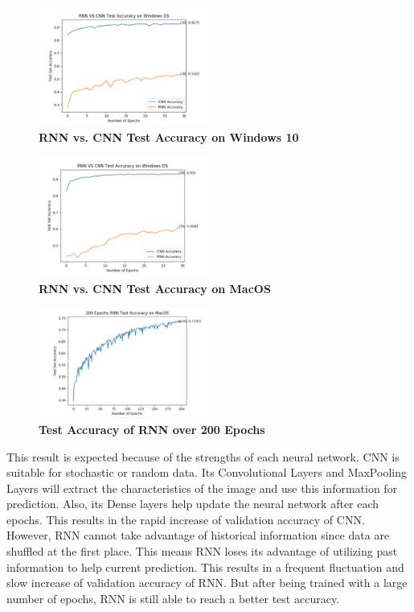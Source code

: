 \documentclass[letterpaper]{article} %
\begin{document}
	\begin{figure}[h!]
		\centering
		\includegraphics[width=0.5\textwidth]{RNN_CNN_Windows.jpg}
		\caption{\textbf{RNN vs. CNN Test Accuracy on Windows 10}}
		\label{fig:test_win10}
	\end{figure}
	
	\begin{figure}[h!]
		\centering
		\includegraphics[width=0.5\textwidth]{RNN_CNN_Mac.jpg}
		\caption{\textbf{RNN vs. CNN Test Accuracy on MacOS}}
		\label{fig:test_macos}
	\end{figure}
	
	\begin{figure}[h!]
		\centering
		\includegraphics[width=0.5\textwidth]{RNN_200_MacOS.jpg}
		\caption{\textbf{Test Accuracy of RNN over 200 Epochs}}
		\label{fig:epoch}
	\end{figure}
	
	This result is expected because of the strengths of each neural network. CNN is suitable for stochastic or random data. Its Convolutional Layers and MaxPooling Layers will extract the characteristics of the image and use this information for prediction. Also, its Dense layers help update the neural network after each epochs. This results in the rapid increase of validation accuracy of CNN. However, RNN cannot take advantage of historical information since data are shuffled at the first place. This means RNN loses its advantage of utilizing past information to help current prediction. This results in a frequent fluctuation and slow increase of validation accuracy of RNN. But after being trained with a large number of epochs, RNN is still able to reach a better test accuracy.
	
\end{document}
